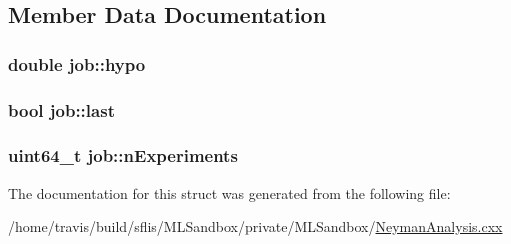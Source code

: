 \subsection{Member Data Documentation}
\hypertarget{structjob_a97b527f70afea9c220bf6af904e5ca06}{
\subsubsection[{hypo}]{\setlength{\rightskip}{0pt plus 5cm}double job\-::hypo}}\label{structjob_a97b527f70afea9c220bf6af904e5ca06}
\hypertarget{structjob_a4ab7aa6c5bd6a19b3da8e4387353ea96}{
\subsubsection[{last}]{\setlength{\rightskip}{0pt plus 5cm}bool job\-::last}}\label{structjob_a4ab7aa6c5bd6a19b3da8e4387353ea96}
\hypertarget{structjob_a3145a4e74a386b4a1922794dc2739410}{
\subsubsection[{n\-Experiments}]{\setlength{\rightskip}{0pt plus 5cm}uint64\-\_\-t job\-::n\-Experiments}}\label{structjob_a3145a4e74a386b4a1922794dc2739410}


The documentation for this struct was generated from the following file\-:\begin{DoxyCompactItemize}
\item 
/home/travis/build/sflis/\-M\-L\-Sandbox/private/\-M\-L\-Sandbox/\hyperlink{MLSandbox_2NeymanAnalysis_8cxx}{Neyman\-Analysis.\-cxx}\end{DoxyCompactItemize}
